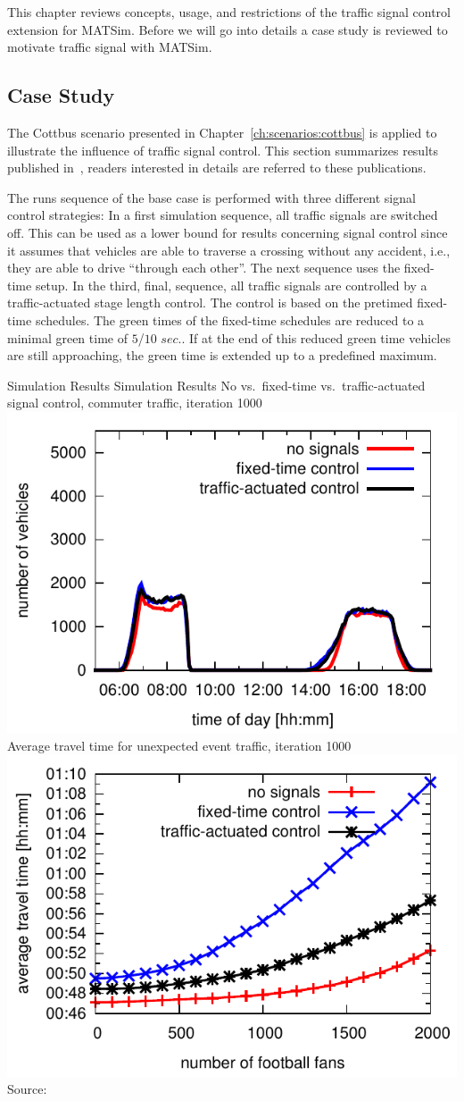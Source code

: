 This chapter reviews concepts, usage, and restrictions of the traffic signal control extension for MATSim. 
Before we will go into details a case study is reviewed to motivate traffic signal with MATSim. 

\subsection{Case Study}

The Cottbus scenario presented in Chapter~\ref{ch:scenarios:cottbus} is applied to illustrate the influence of traffic signal control. 
This section summarizes results published in~\citet{GretherBischoffNagel2011CottbusSylviaEventAbstract,Grether2014PhD}, readers interested in details are referred to these publications. 

%
The runs sequence of the base case is performed with three different signal control strategies:
%
In a first simulation sequence, all traffic signals are switched off. This can be used as a lower bound for results concerning signal control since it assumes that vehicles are able to traverse a crossing without any accident, i.e., they are able to drive ``through each other''. 
%
The next sequence uses the fixed-time setup. 
%
In the third, final, sequence, all traffic signals are controlled by a traffic-actuated stage length control. 
The control is based on the pretimed fixed-time schedules. 
The green times of the fixed-time schedules are reduced to a minimal green time of $5$/$10$ $sec.$. 
If at the end of this reduced green time vehicles are still approaching, the green time is extended up to a predefined maximum. 

\createfigure%
{Simulation Results}%
{Simulation Results}%
{\label{fig:results_histogram}}
{%
  \createsubfigure%
  {No vs.~fixed-time vs.~traffic-actuated signal control, commuter traffic, iteration 1000}%
	{\includegraphics[width=0.48\linewidth]{extending/figures/signalslanes/leg_histogram_1292_1293_1291_it_1000.pdf}}
  {\label{fig:commuter_traffic}}%
  \createsubfigure%
	{Average travel time for unexpected event traffic, iteration 1000}
	{\includegraphics[width=0.48\linewidth]{extending/figures/signalslanes/average_travel_time_1220_1222.pdf}}
	{\label{fig:unexpected_event}}
}%
{Source:~\citet{Grether2014PhD}}

